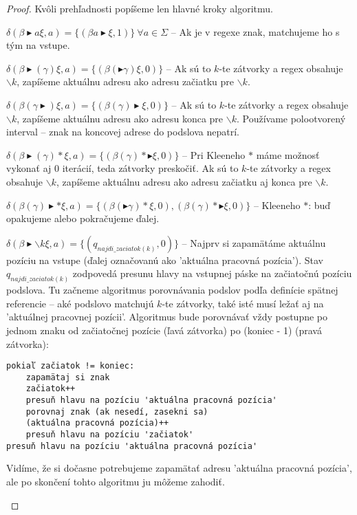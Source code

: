 \begin{proof}
Kvôli prehľadnosti popíšeme len hlavné kroky algoritmu. 
\begin{list}{}{}
\item $\delta(\beta\blacktriangleright a \xi, a) = \lbrace (\beta a \blacktriangleright \xi, 1) \rbrace ~ \forall a \in \Sigma$ -- Ak je v regexe znak, matchujeme ho s tým na vstupe.
\item $\delta(\beta\blacktriangleright(\gamma)\xi, a) = \lbrace (\beta(\blacktriangleright\gamma)\xi, 0) \rbrace$ -- Ak sú to $k$-te zátvorky a regex obsahuje $\backslash k$, zapíšeme aktuálnu adresu ako adresu začiatku pre $\backslash k$.
\item $\delta(\beta(\gamma\blacktriangleright)\xi, a) = \lbrace (\beta(\gamma)\blacktriangleright\xi, 0) \rbrace$ -- Ak sú to $k$-te zátvorky a regex obsahuje $\backslash k$, zapíšeme aktuálnu adresu ako adresu konca pre $\backslash k$. Používame polootvorený interval -- znak na koncovej adrese do podslova nepatrí.
\item $\delta(\beta\blacktriangleright(\gamma)*\xi, a) = \lbrace (\beta(\gamma)*\blacktriangleright\xi, 0) \rbrace$ -- Pri Kleeneho $*$ máme možnosť vykonať aj 0 iterácií, teda zátvorky preskočiť. Ak sú to $k$-te zátvorky a regex obsahuje $\backslash k$, zapíšeme aktuálnu adresu ako adresu začiatku aj konca pre $\backslash k$.
\item $\delta(\beta(\gamma)\blacktriangleright * \xi, a) = \lbrace (\beta(\blacktriangleright\gamma)*\xi, 0),(\beta(\gamma)*\blacktriangleright\xi, 0) \rbrace$ -- Kleeneho $*$: buď opakujeme alebo pokračujeme ďalej.
\item $\delta(\beta\blacktriangleright\backslash k \xi, a) = \lbrace (q_{najdi\_zaciatok(k)}, 0) \rbrace$ -- Najprv si zapamätáme aktuálnu pozíciu na vstupe (ďalej označovanú ako 'aktuálna pracovná pozícia'). Stav $q_{najdi\_zaciatok(k)}$ zodpovedá presunu hlavy na vstupnej páske na začiatočnú pozíciu podslova. Tu začneme algoritmus porovnávania podslov podľa definície spätnej referencie -- aké podslovo matchujú $k$-te zátvorky, také isté musí ležať aj na 'aktuálnej pracovnej pozícii'. Algoritmus bude porovnávať vždy postupne po jednom znaku od začiatočnej pozície (ľavá zátvorka) po (koniec - 1) (pravá zátvorka):

\begin{verbatim}
pokiaľ začiatok != koniec: 
    zapamätaj si znak 
    začiatok++ 
    presuň hlavu na pozíciu 'aktuálna pracovná pozícia' 
    porovnaj znak (ak nesedí, zasekni sa) 
    (aktuálna pracovná pozícia)++ 
    presuň hlavu na pozíciu 'začiatok' 
presuň hlavu na pozíciu 'aktuálna pracovná pozícia'
\end{verbatim}
Vidíme, že si dočasne potrebujeme zapamätať adresu 'aktuálna pracovná pozícia', ale po skončení tohto algoritmu ju môžeme zahodiť.


\end{list}
\end{proof}
